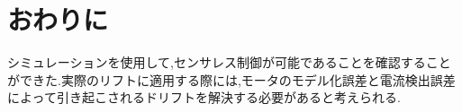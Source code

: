 \chapter{おわりに}シミュレーションを使用して,センサレス制御が可能であることを確認することができた.実際のリフトに適用する際には,モータのモデル化誤差と電流検出誤差によって引き起こされるドリフトを解決する必要があると考えられる.
